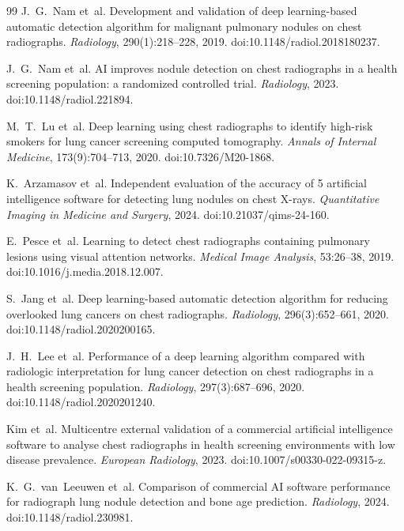 {\begin{thebibliography}{99}
J.~G.~Nam et~al.
\newblock Development and validation of deep learning-based automatic detection algorithm for malignant pulmonary nodules on chest radiographs.
\newblock \emph{Radiology}, 290(1):218--228, 2019. doi:10.1148/radiol.2018180237.

J.~G.~Nam et~al.
\newblock AI improves nodule detection on chest radiographs in a health screening population: a randomized controlled trial.
\newblock \emph{Radiology}, 2023. doi:10.1148/radiol.221894.

M.~T.~Lu et~al.
\newblock Deep learning using chest radiographs to identify high-risk smokers for lung cancer screening computed tomography.
\newblock \emph{Annals of Internal Medicine}, 173(9):704--713, 2020. doi:10.7326/M20-1868.

K.~Arzamasov et~al.
\newblock Independent evaluation of the accuracy of 5 artificial intelligence software for detecting lung nodules on chest X-rays.
\newblock \emph{Quantitative Imaging in Medicine and Surgery}, 2024. doi:10.21037/qims-24-160.

E.~Pesce et~al.
\newblock Learning to detect chest radiographs containing pulmonary lesions using visual attention networks.
\newblock \emph{Medical Image Analysis}, 53:26--38, 2019. doi:10.1016/j.media.2018.12.007.

S.~Jang et~al.
\newblock Deep learning-based automatic detection algorithm for reducing overlooked lung cancers on chest radiographs.
\newblock \emph{Radiology}, 296(3):652--661, 2020. doi:10.1148/radiol.2020200165.

J.~H.~Lee et~al.
\newblock Performance of a deep learning algorithm compared with radiologic interpretation for lung cancer detection on chest radiographs in a health screening population.
\newblock \emph{Radiology}, 297(3):687--696, 2020. doi:10.1148/radiol.2020201240.

Kim et~al.
\newblock Multicentre external validation of a commercial artificial intelligence software to analyse chest radiographs in health screening environments with low disease prevalence.
\newblock \emph{European Radiology}, 2023. doi:10.1007/s00330-022-09315-z.

K.~G.~van~Leeuwen et~al.
\newblock Comparison of commercial AI software performance for radiograph lung nodule detection and bone age prediction.
\newblock \emph{Radiology}, 2024. doi:10.1148/radiol.230981.


\end{thebibliography}}
